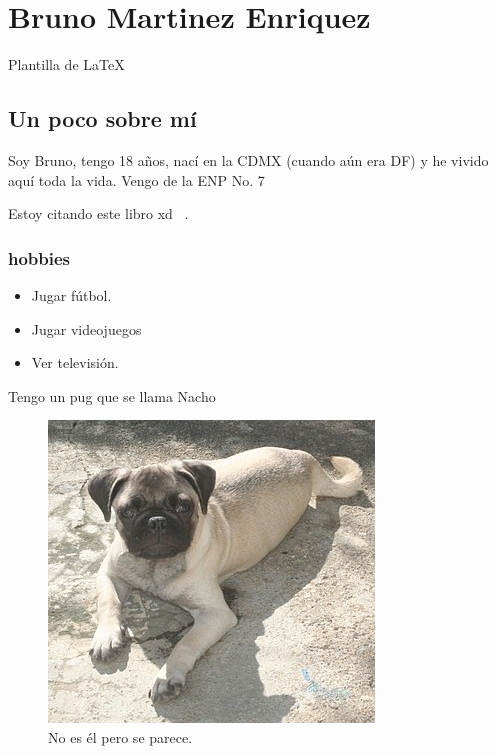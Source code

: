 
\chapter{Bruno Martinez Enriquez}

Plantilla de \large{\LaTeX}
\section{Un poco sobre mí}

Soy Bruno, tengo 18 años, nací en la CDMX (cuando aún era DF) y he vivido aquí toda la vida.
Vengo de la ENP No. 7

Estoy citando este libro xd ~\cite{Floodlight}.

\subsection{hobbies}
\begin{itemize}
\item Jugar fútbol.
\item Jugar videojuegos
\item Ver televisión.
\end {itemize}

Tengo un pug que se llama Nacho
\begin{figure}[h]
  \centering
  \includegraphics[scale=0.5]{IMG/30.jpg}
  \caption{No es él pero se parece.}
  \label{fig:pug}
\end{figure}






